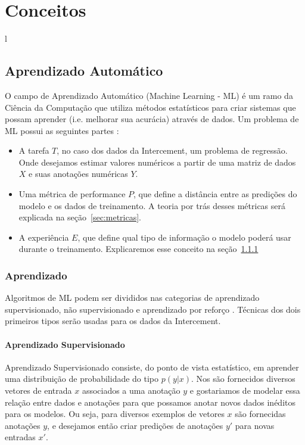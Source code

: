\chapter{Conceitos}
l\label{cap:conceitos}


\section{Aprendizado Automático}

O campo de Aprendizado Automático (Machine Learning - ML) é um ramo da Ciência
da Computação que utiliza métodos estatísticos para criar sistemas que possam
aprender (i.e. melhorar sua acurácia) através de dados. Um problema de ML possui
as seguintes partes \citep{dlbook}: \\

\begin{itemize}

  
\item A tarefa $T$, no caso dos dados da Intercement, um problema de regressão.
  Onde desejamos estimar valores numéricos a partir de uma matriz de dados $X$ e
  suas anotações numéricas $Y$.  
  
\item Uma métrica de performance $P$, que define a distância entre as predições
  do modelo e os dados de treinamento. A teoria por trás desses métricas será explicada na seção~\ref{sec:metricas}.

\item A experiência $E$, que define qual tipo de informação o modelo poderá usar
  durante o treinamento. Explicaremos esse conceito na seção~\ref{sec:exp} 
  
\end{itemize}

\subsection{Aprendizado}
\label{sec:exp}
Algoritmos de ML podem ser divididos nas categorias de aprendizado supervisionado, não supervisionado e aprendizado por reforço \citep{dlbook}. Técnicas dos dois primeiros tipos serão usadas para os dados da Intercement.


\subsubsection{Aprendizado Supervisionado}
\label{sec:apren} 
Aprendizado Supervisionado consiste, do ponto de vista estatístico, em aprender uma distribuição
de probabilidade do tipo $p(y | x)$. Nos são fornecidos diversos vetores de
entrada $x$ associados a uma anotação $y$ e gostariamos de modelar essa relação
entre dados e anotações para que possamos anotar novos dados inéditos para os
modelos. Ou seja, para diversos exemplos de vetores
$x$ são fornecidas anotações $y$, e desejamos então criar predições de anotações
$y'$ para novas entradas $x'$.


